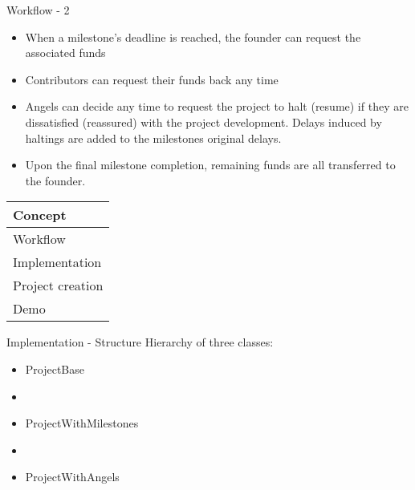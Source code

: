 \documentclass{beamer}
\begin{document}
\begin{frame}{Workflow - 2}
\begin{itemize}
	\item When a milestone's deadline is reached, the founder can request the associated funds
	\item Contributors can request their funds back any time
	\item Angels can decide any time to request the project to halt (resume) if they are dissatisfied (reassured) with the project development. Delays induced by haltings are added to the milestones original delays.
	\item Upon the final milestone completion, remaining funds are all transferred to the founder.
\end{itemize}
\end{frame}


\begin{frame}
	\begin{tabularx}{\textwidth}{X}
		\hline
		Concept\\
		\hline
		Workflow\\
		\hline
		\rowcolor{hcolor}
		Implementation\\
		\hline
		Project creation\\
		\hline
		Demo\\
		\hline
	\end{tabularx}
\end{frame}


\begin{frame}{Implementation - Structure}
Hierarchy of three classes:
\begin{itemize}
	\item ProjectBase
	\item[]
	\item ProjectWithMilestones
	\item[]
	\item ProjectWithAngels
\end{itemize}
\end{frame}
\end{document}

